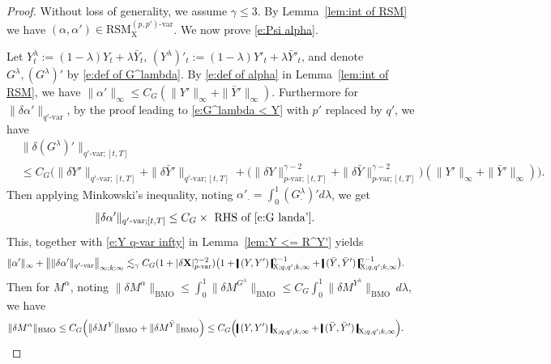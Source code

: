 \documentclass[11pt,reqno]{amsart}
\numberwithin{equation}{section}
\newcommand{\shortthickbar}{%
  \vcenter{\hbox{\rule{1.8pt}{2.2ex}}}%
}
\newcommand{\thicknm}[1]{%
  \mathopen{\shortthickbar}%
  \mkern4mu #1 \mkern4mu%
  \mathclose{\shortthickbar}%
}
\begin{document}
\begin{proof}
Without loss of generality, we assume $\gamma \le 3$. By Lemma~\ref{lem:int of RSM} we have $(\alpha,\alpha') \in \mathrm{RSM}^{(p,p')\text{-}\mathrm{var}}_{\mathrm X}$. We now prove \eqref{e:Psi alpha}. 

Let $Y^{\lambda}_t := (1-\lambda)Y_t + \lambda \bar Y_t$, $(Y^{\lambda})'_t := (1-\lambda)Y'_t + \lambda \bar Y'_t$, and denote $G^{\lambda}, (G^{\lambda})'$ by \eqref{e:def of G^lambda}. By \eqref{e:def of alpha} in Lemma~\ref{lem:int of RSM}, we have $\|\alpha'\|_{\infty} \le C_G (\|Y'\|_{\infty}+ \|\bar Y'\|_{\infty})$. Furthermore for $\|\delta \alpha'\|_{q'\text{-}\mathrm{var}}$, by the proof leading to \eqref{e:G^lambda < Y} with $p'$ replaced by $q'$, we have 
\begin{equation}\label{e:G landa'}
\begin{aligned}
&\|\delta (G^{\lambda})'\|_{q'\text{-}\mathrm{var};[t,T]} \\
&\le C_G \Big( \|\delta Y'\|_{q'\text{-}\mathrm{var};[t,T]} + \|\delta \bar Y'\|_{q'\text{-}\mathrm{var};[t,T]} + \big(\|\delta Y\|^{\gamma - 2}_{p\text{-}\mathrm{var};[t,T]} + \|\delta \bar Y\|^{\gamma - 2}_{p\text{-}\mathrm{var};[t,T]}\big) (\|Y'\|_{\infty} + \|\bar Y'\|_{\infty}) \Big).
\end{aligned}
\end{equation}
Then applying Minkowski's inequality, noting $\alpha'_{\bm\cdot} = \int_{0}^{1} (G^{\lambda}_{\bm\cdot})' d\lambda$, we get 
\begin{equation*}
\begin{aligned}
&\|\delta \alpha'\|_{q'\text{-}\mathrm{var};[t,T]} \le C_G \times  \text{ RHS of \eqref{e:G landa'}}.
\end{aligned}
\end{equation*}
This, together with \eqref{e:Y q-var infty} in  Lemma~\ref{lem:Y <= R^Y'} yields 
\begin{equation}\label{e:alpha'}
\begin{aligned}
&\|\alpha'\|_{\infty} + \big\| \|\delta \alpha'\|_{q'\text{-}\mathrm{var}} \big\|_{\infty;k;\infty} \lesssim_{\gamma} C_G 
(1 + |\delta \mathbf X|^{\gamma - 2}_{p\text{-}\mathrm{var}})
\big( 1 + \thicknm{(Y,Y')}_{\mathrm X;q,q';k,\infty}^{\gamma - 1} + \thicknm{(\bar Y,\bar Y')}_{\mathrm X;q,q';k,\infty}^{\gamma - 1} \big).
\end{aligned}
\end{equation}
Then for $M^{\alpha}$, noting $\|\delta M^{\alpha}\|_{\mathrm{BMO}} \le \int_{0}^{1} \|\delta M^{G^{\lambda}}\|_{\mathrm{BMO}} \le C_G \int_{0}^{1} \|\delta M^{Y^{\lambda}}\|_{\mathrm{BMO}} \, d\lambda$, we have  
\begin{equation}\label{e:M^alpha}
\begin{aligned}
\|\delta M^{\alpha}\|_{\mathrm{BMO}} &\le C_{G} \Big( \|\delta M^{Y}\|_{\mathrm{BMO}} + \|\delta M^{\bar Y}\|_{\mathrm{BMO}} \Big) \le C_G \Big( \thicknm{(Y,Y')}_{\mathrm X;q,q';k,\infty} + \thicknm{(\bar Y,\bar Y' )}_{\mathrm X;q,q';k,\infty} \Big).
\end{aligned}
\end{equation}


\end{proof}
\end{document}
